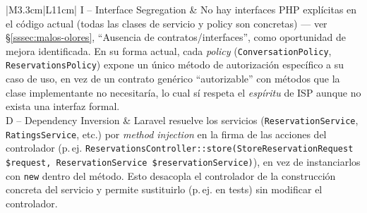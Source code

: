 {\begin{longtable}{|M{3.3cm}|L{11cm}|}
I -- Interface Segregation &
No hay interfaces PHP explícitas en el código actual (todas las clases de servicio y policy son concretas) --- ver \S\ref{sssec:malos-olores}, ``Ausencia de contratos/interfaces'', como oportunidad de mejora identificada. En su forma actual, cada \textit{policy} (\texttt{ConversationPolicy}, \texttt{ReservationsPolicy}) expone un único método de autorización específico a su caso de uso, en vez de un contrato genérico ``autorizable'' con métodos que la clase implementante no necesitaría, lo cual sí respeta el \emph{espíritu} de ISP aunque no exista una interfaz formal. \\ \hline
D -- Dependency Inversion &
Laravel resuelve los servicios (\texttt{ReservationService}, \texttt{RatingsService}, etc.) por \textit{method injection} en la firma de las acciones del controlador (p.\,ej. \texttt{ReservationsController::store(\-StoreReservationRequest \$request, ReservationService \$reservationService)}), en vez de instanciarlos con \texttt{new} dentro del método. Esto desacopla el controlador de la construcción concreta del servicio y permite sustituirlo (p.\,ej. en tests) sin modificar el controlador. \\ \hline
\end{longtable}
}


